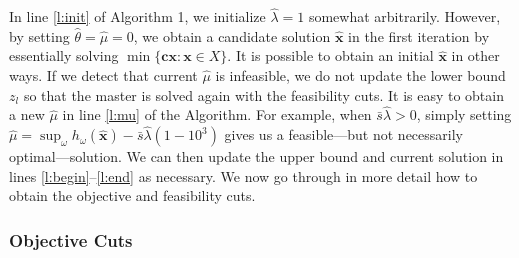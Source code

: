 \documentclass[opre,nonblindrev]{informs3} %
\newcommand{\x}{\mathbf{x}}
\newcommand{\xh}{\hat{\x}}
\renewcommand{\c}{\mathbf{c}}
\begin{document}
In line \ref{l:init} of Algorithm 1, we initialize $\hat{\lambda} = 1$ somewhat arbitrarily. 
However, by setting $\hat{\theta}=\hat{\mu}=0$, we obtain a candidate solution $\xh$ in the first iteration by essentially solving $\min\{\c\x: \x \in X\}$. 
It is possible to obtain an initial $\xh$ in other ways. 
If we detect that current $\hat{\mu}$ is infeasible, we do not update the lower bound $z_l$ so that the master is solved again with the feasibility cuts. 
It is easy to obtain a new $\hat{\mu}$ in line \ref{l:mu} of the Algorithm.
For example, when $\bar{s}\hat{\lambda}>0$, simply setting  $\hat{\mu} = \sup_\omega h_\omega (\xh) -\bar{s}\hat{\lambda} (1-10^3)$ gives us a feasible---but not necessarily optimal---solution. 
We can then update the upper bound and current solution in lines \ref{l:begin}--\ref{l:end} as necessary.
We now go through in more detail how to obtain the objective and feasibility cuts. 



\subsubsection{Objective Cuts}
\end{document}
